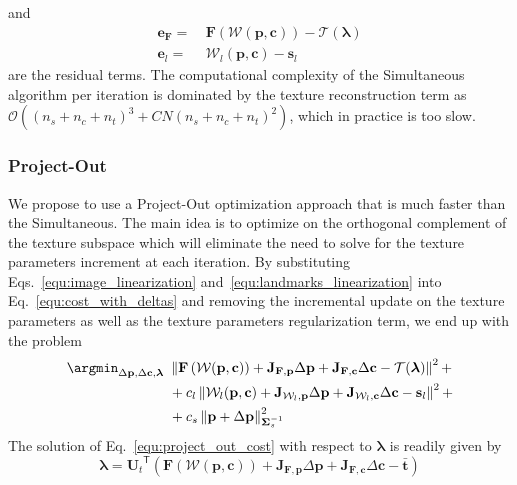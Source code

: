 %
and
%
\begin{equation}
\begin{aligned}
\mathbf{e}_{\mathbf{F}} = &~\mathbf{F}\left(\mathcal{W}(\mathbf{p},\mathbf{c})\right) - \mathcal{T}(\boldsymbol{\lambda})\\
\mathbf{e}_l = &~\mathcal{W}_l(\mathbf{p},\mathbf{c}) - \mathbf{s}_l
\end{aligned}
\end{equation}
%
are the residual terms. The computational complexity of the Simultaneous algorithm per iteration is dominated by the texture reconstruction term as
$\mathcal{O}((n_s+n_c+n_t)^3 + CN(n_s+n_c+n_t)^2)$, which in practice is too slow.



%
\subsubsection{Project-Out}
We propose to use a Project-Out optimization approach that is much faster than the Simultaneous. The main idea is to optimize on the orthogonal complement of the texture subspace which will eliminate the need to solve for the texture parameters increment at each iteration. By substituting Eqs.~\ref{equ:image_linearization} and~\ref{equ:landmarks_linearization}
into Eq.~\ref{equ:cost_with_deltas} and removing the incremental update on the
texture parameters as well as the texture parameters regularization term,
we end up with the problem
%
\begin{equation}
\begin{aligned}
\argmin_{\Delta\mathbf{p},\Delta\mathbf{c},\boldsymbol{\lambda}}~& \left\lVert\mathbf{F}\left(\mathcal{W}(\mathbf{p},\mathbf{c})\right) + \mathbf{J}_{\mathbf{F},\mathbf{p}}\Delta\mathbf{p} + \mathbf{J}_{\mathbf{F},\mathbf{c}}\Delta\mathbf{c} - \mathcal{T}(\boldsymbol{\lambda})\right\rVert^2 + \\
& + c_l\left\lVert\mathcal{W}_l(\mathbf{p},\mathbf{c}) + \mathbf{J}_{\mathcal{W}_l,\mathbf{p}}\Delta\mathbf{p} + \mathbf{J}_{\mathcal{W}_l,\mathbf{c}}\Delta\mathbf{c} - \mathbf{s}_l\right\rVert^2 +\\
& + c_s\left\lVert\mathbf{p}+\Delta\mathbf{p}\right\rVert^2_{\mathbf{\Sigma}_s^{-1}}
\end{aligned}
\label{equ:project_out_cost}
\end{equation}
%
The solution of Eq.~\ref{equ:project_out_cost} with respect to $\boldsymbol{\lambda}$ is
readily given by
%
\begin{equation}
\boldsymbol{\lambda} = {\mathbf{U}_t}^\mathsf{T} \left(\mathbf{F}(\mathcal{W}(\mathbf{p},\mathbf{c})) + \mathbf{J}_{\mathbf{F},\mathbf{p}}\Delta\mathbf{p} + \mathbf{J}_{\mathbf{F},\mathbf{c}}\Delta\mathbf{c} - \bar{\mathbf{t}}\right)
\label{equ:lambda_solution}
\end{equation}
